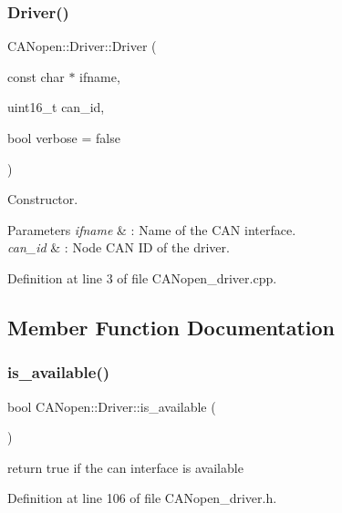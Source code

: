 \subsubsection{\texorpdfstring{Driver()}{Driver()}}
{\footnotesize\ttfamily C\+A\+Nopen\+::\+Driver\+::\+Driver (\begin{DoxyParamCaption}\item[{const char $\ast$}]{ifname,  }\item[{uint16\+\_\+t}]{can\+\_\+id,  }\item[{bool}]{verbose = {\ttfamily false} }\end{DoxyParamCaption})}



Constructor. 


\begin{DoxyParams}{Parameters}
{\em ifname} & \+: Name of the C\+AN interface. \\
\hline
{\em can\+\_\+id} & \+: Node C\+AN ID of the driver. \\
\hline
\end{DoxyParams}


Definition at line 3 of file C\+A\+Nopen\+\_\+driver.\+cpp.



\subsection{Member Function Documentation}
\mbox{\label{class_c_a_nopen_1_1_driver_a249f11262c9264cf53486c247d004b99}} 
\subsubsection{\texorpdfstring{is\+\_\+available()}{is\_available()}}
{\footnotesize\ttfamily bool C\+A\+Nopen\+::\+Driver\+::is\+\_\+available (\begin{DoxyParamCaption}{ }\end{DoxyParamCaption})\hspace{0.3cm}{\ttfamily [inline]}}



return true if the can interface is available 



Definition at line 106 of file C\+A\+Nopen\+\_\+driver.\+h.

